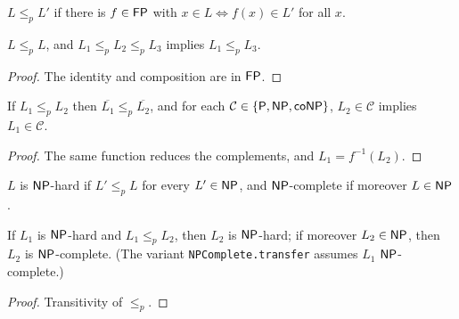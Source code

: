 \begin{definition}
  \label{def:reduction}
  \leanok
  $L \le_p L'$ if there is $f \in \mathsf{FP}$ with $x \in L \iff f(x) \in L'$ for
  all $x$.
\end{definition}

\begin{lemma}[$\le_p$ is a preorder]
  \label{lem:polytime-reduction-preorder}
  \leanok
  $L \le_p L$, and $L_1 \le_p L_2 \le_p L_3$ implies $L_1 \le_p L_3$.
\end{lemma}
\begin{proof}
  \leanok
  The identity and composition are in $\mathsf{FP}$.
\end{proof}

\begin{lemma}
  \label{lem:polytime-reduction-transport}
  \leanok
  If $L_1 \le_p L_2$ then $\overline{L_1} \le_p \overline{L_2}$, and for each
  $\mathcal{C} \in \{\mathsf{P}, \mathsf{NP}, \mathsf{coNP}\}$, $L_2 \in \mathcal{C}$
  implies $L_1 \in \mathcal{C}$.
\end{lemma}
\begin{proof}
  \leanok
  The same function reduces the complements, and $L_1 = f^{-1}(L_2)$.
\end{proof}

\begin{definition}
  \label{def:np-complete}
  \leanok
  $L$ is $\mathsf{NP}$-hard if $L' \le_p L$ for every $L' \in \mathsf{NP}$, and
  $\mathsf{NP}$-complete if moreover $L \in \mathsf{NP}$.
\end{definition}

\begin{lemma}
  \label{lem:polytime-np-hard-transfer}
  \leanok
  If $L_1$ is $\mathsf{NP}$-hard and $L_1 \le_p L_2$, then $L_2$ is
  $\mathsf{NP}$-hard; if moreover $L_2 \in \mathsf{NP}$, then $L_2$ is
  $\mathsf{NP}$-complete. (The variant \texttt{NPComplete.transfer} assumes $L_1$
  $\mathsf{NP}$-complete.)
\end{lemma}
\begin{proof}
  \leanok
  Transitivity of $\le_p$.
\end{proof}


